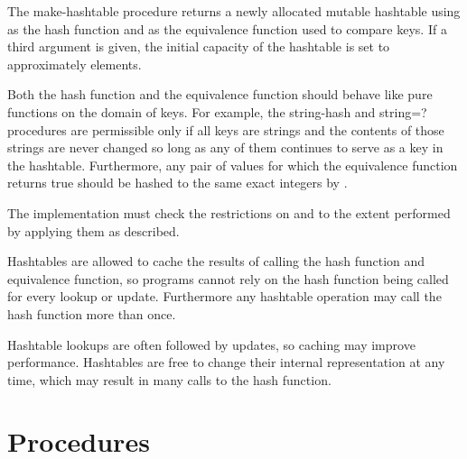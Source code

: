 \begin{entry}{%
}

The {\cf make-hashtable} procedure returns a newly allocated mutable
hashtable using  
as the hash function and  as the equivalence function used to 
compare keys.
If a third argument is given, the 
initial capacity of the hashtable is set to approximately  elements.

Both the hash function  and the equivalence
function  should behave like pure functions
on the domain of keys.  For example, the {\cf string-hash}
and {\cf string=?} procedures are permissible only if all
keys are strings and the contents of those strings are never
changed so long as any of them continues to serve as a key in
the hashtable.  Furthermore, any pair of values for which
the equivalence function  returns true should
be hashed to the same exact integers by 
.

\implresp The implementation must check the restrictions on
 and  to the extent performed by
applying them as described.

\begin{note}
Hashtables are allowed to cache the results of calling the
hash function and equivalence function, so programs cannot
rely on the hash function being called for every lookup or
update.  Furthermore any hashtable operation may call the
hash function more than once.
\end{note}

\begin{rationale}
Hashtable lookups are often followed by updates, so caching
may improve performance.  Hashtables are free to change
their internal representation at any time, which may result
in many calls to the hash function.
\end{rationale}

\end{entry}

\section{Procedures}

